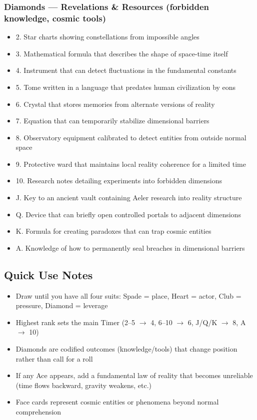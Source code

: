 \documentclass[11pt]{article}
\begin{document}
\subsubsection{Diamonds --- Revelations \& Resources (forbidden knowledge, cosmic tools)}
\begin{itemize}[leftmargin=*]
\item 2. Star charts showing constellations from impossible angles
\item 3. Mathematical formula that describes the shape of space-time itself
\item 4. Instrument that can detect fluctuations in the fundamental constants
\item 5. Tome written in a language that predates human civilization by eons
\item 6. Crystal that stores memories from alternate versions of reality
\item 7. Equation that can temporarily stabilize dimensional barriers
\item 8. Observatory equipment calibrated to detect entities from outside normal space
\item 9. Protective ward that maintains local reality coherence for a limited time
\item 10. Research notes detailing experiments into forbidden dimensions
\item J. Key to an ancient vault containing Aeler research into reality structure
\item Q. Device that can briefly open controlled portals to adjacent dimensions
\item K. Formula for creating paradoxes that can trap cosmic entities
\item A. Knowledge of how to permanently seal breaches in dimensional barriers
\end{itemize}

\subsection*{Quick Use Notes}
\begin{itemize}[leftmargin=*]
\item Draw until you have all four suits: Spade = place, Heart = actor, Club = pressure, Diamond = leverage
\item Highest rank sets the main Timer (2--5 $\rightarrow$ 4, 6--10 $\rightarrow$ 6, J/Q/K $\rightarrow$ 8, A $\rightarrow$ 10)
\item Diamonds are codified outcomes (knowledge/tools) that change position rather than call for a roll
\item If any Ace appears, add a fundamental law of reality that becomes unreliable (time flows backward, gravity weakens, etc.)
\item Face cards represent cosmic entities or phenomena beyond normal comprehension
\end{itemize}
\end{document}
